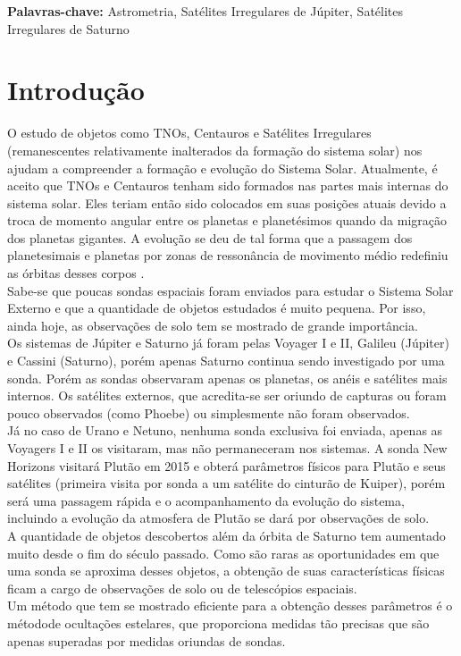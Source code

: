 \documentclass[12pt,a4paper]{monografia}
\begin{document}
\par
\vspace{1em}
\noindent\textbf{Palavras-chave:} Astrometria, Satélites Irregulares de Júpiter, Satélites Irregulares de Saturno


\tableofcontents %
\thispagestyle{empty} %

\pagestyle{ruledheader}

\chapter{Introdução}
\label{Cap:intro}

\indent \indent O estudo de objetos como TNOs, Centauros e Satélites Irregulares (remanescentes relativamente inalterados da formação do sistema solar) nos ajudam a compreender a formação e evolução do Sistema Solar. Atualmente, é aceito que TNOs e Centauros tenham sido formados nas partes mais internas do sistema solar. Eles teriam então sido colocados em suas posições atuais devido a troca de momento angular entre os planetas e planetésimos quando da migração dos planetas gigantes. A evolução se deu de tal forma que a passagem dos planetesimais e planetas por zonas de ressonância de movimento médio redefiniu as órbitas desses corpos \cite{Tsiganis2005}.\\
\indent Sabe-se que poucas sondas espaciais foram enviados para estudar o Sistema Solar Externo e que a quantidade de objetos estudados é muito pequena. Por isso, ainda hoje, as observações de solo tem se mostrado de grande importância.\\
\indent Os sistemas de Júpiter e Saturno já foram pelas Voyager I e II, Galileu (Júpiter) e Cassini (Saturno), porém apenas Saturno continua sendo investigado por uma sonda. Porém as sondas observaram apenas os planetas, os anéis e satélites mais internos. Os satélites externos, que acredita-se ser oriundo de capturas ou foram pouco observados (como Phoebe) ou simplesmente não foram observados.\\
\indent Já no caso de Urano e Netuno, nenhuma sonda exclusiva foi enviada, apenas as Voyagers I e II os visitaram, mas não permaneceram nos sistemas. A sonda New Horizons visitará Plutão em 2015 e obterá parâmetros físicos para Plutão e seus satélites (primeira visita por sonda a um satélite do cinturão de Kuiper), porém será uma passagem rápida e o acompanhamento da evolução do sistema, incluindo a evolução da atmosfera de Plutão se dará por observações de solo.\\
\indent A quantidade de objetos descobertos além da órbita de Saturno tem aumentado muito desde o fim do século passado. Como são raras as oportunidades em que uma sonda se aproxima desses objetos, a obtenção de suas características físicas ficam a cargo de observações de solo ou de
telescópios espaciais.\\
\indent Um método que tem se mostrado eficiente para a obtenção desses parâmetros é o métodode ocultações estelares, que proporciona medidas tão precisas que são apenas superadas por
medidas oriundas de sondas.
\end{document}
